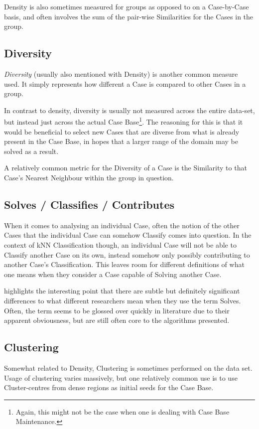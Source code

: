 \documentclass[a4paper,11pt]{report}
\begin{document}
Density is also sometimes measured for groups as opposed to on a Case-by-Case basis\citep{Smyth1998}, and often involves the sum of the pair-wise Similarities for the Cases in the group.

\subsection{Diversity}

\emph{Diversity} (usually also mentioned with Density) is another common measure used. It simply represents how different a Case is compared to other Cases in a group.

In contrast to density, diversity is usually not measured across the entire data-set, but instead just across the actual Case Base\footnote{Again, this might not be the case when one is dealing with Case Base Maintenance.}. The reasoning for this is that it would be beneficial to select new Cases that are diverse from what is already present in the Case Base, in hopes that a larger range of the domain may be solved as a result. 

A relatively common metric for the Diversity of a Case is the Similarity to that Case's Nearest Neighbour within the group in question.

\subsection{Solves / Classifies / Contributes}
When it comes to analysing an individual Case, often the notion of the other Cases that the individual Case can somehow Classify comes into question. In the context of kNN Classification though, an individual Case will not be able to Classify another Case on its own, instead somehow only possibly contributing to another Case's Classification. This leaves room for different definitions of what one means when they consider a Case capable of Solving another Case. 

\citet{BridgeUpcoming} highlights the interesting point that there are subtle but definitely significant differences to what different researchers mean when they use the term Solves. Often, the term seems to be glossed over quickly in literature due to their apparent obviousness, but are still often core to the algorithms presented.

\subsection{Clustering}
Somewhat related to Density, Clustering is sometimes performed on the data set. Usage of clustering varies massively, but one relatively common use is to use Cluster-centres from dense regions as initial seeds for the Case Base.
\end{document}
